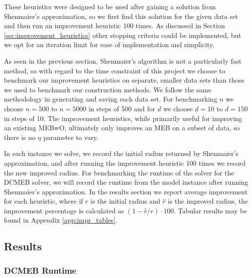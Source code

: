 \documentclass[11pt,twoside]{report}
\theoremstyle{definition}
\numberwithin{theorem}{section}
\numberwithin{definition}{section}
\numberwithin{lemma}{section}
\numberwithin{proposition}{section}
\numberwithin{equation}{section}
\numberwithin{figure}{section}
\begin{document}
These heuristics were designed to be used after gaining a solution from Shenmaier's approximation, so we first find this solution for the given data set and then run an improvement heuristic 100 times. As discussed in Section \ref{sec:improvement_heuristics} other stopping criteria could be implemented, but we opt for an iteration limit for ease of implementation and simplicity.

As seen in the previous section, Shenmaier's algorithm is not a particularly fast method, so with regard to the time constraint of this project we choose to benchmark our improvement heuristics on separate, smaller data sets than those we used to benchmark our construction methods. We follow the same methodology in generating and saving each data set. For benchmarking $n$ we choose $n=500$ to $n=5000$ in steps of 500 and for $d$ we choose $d=10$ to $d=150$ in steps of 10. The improvement heuristics, while primarily useful for improving an existing MEBwO, ultimately only improves an MEB on a subset of data, so there is no $\eta$ parameter to vary.

In each instance we solve, we record the initial radius returned by Shenmaier's approximation, and after running the improvement heuristic 100 times we record the new improved radius. For benchmarking the runtime of the solver for the DCMEB solver, we will record the runtime from the model instance after running Shenmaier's approximation.  In the results section we report average improvement for each heuristic, where if $r$ is the initial radius and $\hat{r}$ is the improved radius, the improvement percentage is calculated as $(1-\hat{r}/r)\cdot100$. Tabular results may be found in Appendix \ref{app:impr_tables}.

\subsection{Results}\label{sec:impr_results}
\subsubsection{DCMEB Runtime}
\end{document}
